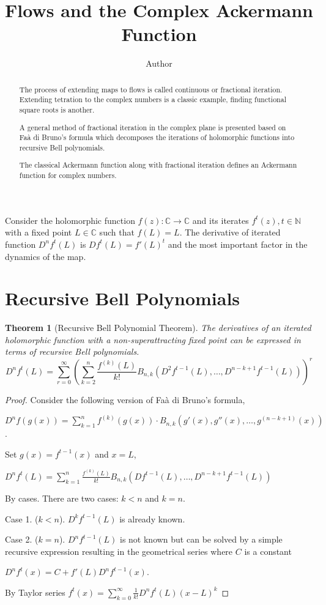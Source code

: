 \documentclass{article}
\newtheorem{theorem}{Theorem}
\theoremstyle{definition}
\begin{document}
\title{Flows and the Complex Ackermann Function}
\author{Author}

\maketitle

\begin{abstract}
The process of extending maps to flows is called continuous or fractional iteration. Extending tetration to the complex numbers is a classic example, finding functional square roots is another.

A general method of fractional iteration in the complex plane is presented based on Faà di Bruno's formula which decomposes the iterations of holomorphic functions into recursive Bell polynomials.

The classical Ackermann function along with fractional iteration defines an Ackermann function for complex numbers. 
\end{abstract}

\noindent

Consider the holomorphic function $f(z): \mathbb{C} \rightarrow \mathbb{C}$ and its iterates $f^t(z), t \in \mathbb{N}$ with a fixed point $L\in\mathbb{C}$ such that $f(L)=L$. The derivative of iterated function $D^nf^t(L)$ is $Df^t(L)=f'(L)^t$ and the most important factor in the dynamics of the map.

\section{Recursive Bell Polynomials}

\begin{theorem}[Recursive Bell Polynomial Theorem]
The derivatives of an iterated holomorphic function with a non-superattracting fixed point can be expressed in terms of recursive Bell polynomials.
$$D^nf^t(L)=\sum_{r=0}^\infty(\sum_{k=2}^n \frac{f^{(k)}(L)}{k!} B_{n,k}(D^2f^{t-1}(L),\ldots, D^{n-k+1}f^{t-1}(L)))^r$$
\end{theorem}

\begin{proof}
Consider the following version of Faà di Bruno's formula, \cite{weisstein}

${D^n} f(g(x)) = \sum_{k=1}^n f^{(k)}(g(x))\cdot B_{n,k}\left(g'(x),g''(x),\dots,g^{(n-k+1)}(x)\right)$.

Set $g(x)=f^{t-1}(x)$ and $x=L$,

$D^nf^t(L)=\sum_{k=1}^n \frac{f^{(k)}(L)}{k!} B_{n,k}(Df^{t-1}(L),\ldots, D^{n-k+1}f^{t-1}(L))$

By cases. There are two cases: $k<n$ and $k=n$.

Case 1. ($k<n$). $D^kf^{t-1}(L)$ is already known.

Case 2. ($k=n$). $D^nf^{t-1}(L)$ is not known but can be solved by a simple recursive expression resulting in the geometrical series where $C$ is a constant

$D^nf^t(x)=C+f'(L)D^nf^{t-1}(x)$.

By Taylor series $f^t(x)=\sum_{k=0}^\infty\frac{1}{k!} D^nf^t(L) (x - L)^k$
\end{proof}
\end{document}
